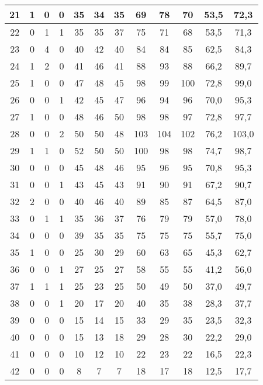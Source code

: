 \begin{center}
\begin{longtable}{|c|c|c|c|c|c|c|c|c|c|c|c|}
		21 & 1 & 0 & 0 & 35 & 34 & 35 & 69  & 78  & 70  & 53,5     & 72,3   \\ \hline
		22 & 0 & 1 & 1 & 35 & 35 & 37 & 75  & 71  & 68  & 53,5     & 71,3   \\ \hline
		23 & 0 & 4 & 0 & 40 & 42 & 40 & 84  & 84  & 85  & 62,5     & 84,3   \\ \hline
		24 & 1 & 2 & 0 & 41 & 46 & 41 & 88  & 93  & 88  & 66,2     & 89,7   \\ \hline
		25 & 1 & 0 & 0 & 47 & 48 & 45 & 98  & 99  & 100 & 72,8     & 99,0   \\ \hline
		26 & 0 & 0 & 1 & 42 & 45 & 47 & 96  & 94  & 96  & 70,0     & 95,3   \\ \hline
		27 & 1 & 0 & 0 & 48 & 46 & 50 & 98  & 98  & 97  & 72,8     & 97,7   \\ \hline
		28 & 0 & 0 & 2 & 50 & 50 & 48 & 103 & 104 & 102 & 76,2     & 103,0  \\ \hline
		29 & 1 & 1 & 0 & 52 & 50 & 50 & 100 & 98  & 98  & 74,7     & 98,7   \\ \hline
		30 & 0 & 0 & 0 & 45 & 48 & 46 & 95  & 96  & 95  & 70,8     & 95,3   \\ \hline
		31 & 0 & 0 & 1 & 43 & 45 & 43 & 91  & 90  & 91  & 67,2     & 90,7   \\ \hline
		32 & 2 & 0 & 0 & 40 & 46 & 40 & 89  & 85  & 87  & 64,5     & 87,0   \\ \hline
		33 & 0 & 1 & 1 & 35 & 36 & 37 & 76  & 79  & 79  & 57,0     & 78,0   \\ \hline
		34 & 0 & 0 & 0 & 39 & 35 & 35 & 75  & 75  & 75  & 55,7     & 75,0   \\ \hline
		35 & 1 & 0 & 0 & 25 & 30 & 29 & 60  & 63  & 65  & 45,3     & 62,7   \\ \hline
		36 & 0 & 0 & 1 & 27 & 25 & 27 & 58  & 55  & 55  & 41,2     & 56,0   \\ \hline
		37 & 1 & 1 & 1 & 25 & 23 & 25 & 50  & 49  & 50  & 37,0     & 49,7   \\ \hline
		38 & 0 & 0 & 1 & 20 & 17 & 20 & 40  & 35  & 38  & 28,3     & 37,7   \\ \hline
		39 & 0 & 0 & 0 & 15 & 14 & 15 & 33  & 29  & 35  & 23,5     & 32,3   \\ \hline
		40 & 0 & 0 & 0 & 15 & 13 & 18 & 29  & 28  & 30  & 22,2     & 29,0   \\ \hline
		41 & 0 & 0 & 0 & 10 & 12 & 10 & 22  & 23  & 22  & 16,5     & 22,3   \\ \hline
		42 & 0 & 0 & 0 & 8  & 7  & 7  & 18  & 17  & 18  & 12,5     & 17,7   \\ \hline

\end{longtable}
\end{center}
